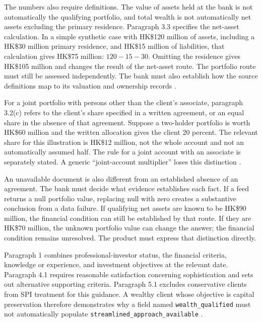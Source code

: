 The numbers also require definitions. The value of assets held at the bank is
not automatically the qualifying portfolio, and total wealth is not automatically
net assets excluding the primary residence. Paragraph 3.3 specifies the net-asset
calculation. In a simple synthetic case with HK\$120 million of assets, including
a HK\$30 million primary residence, and HK\$15 million of liabilities, that
calculation gives HK\$75 million: $120-15-30$. Omitting the residence gives
HK\$105 million and changes the result of the net-asset route. The portfolio
route must still be assessed independently. The bank must also establish how the
source definitions map to its valuation and ownership records
\citep[Annex 1, paras.~3.2--3.4]{sfcspiannex1}.

For a joint portfolio with persons other than the client's associate, paragraph
3.2(c) refers to the client's share specified in a written agreement, or an equal
share in the absence of that agreement. Suppose a two-holder portfolio is worth
HK\$60 million and the written allocation gives the client 20 percent. The
relevant share for this illustration is HK\$12 million, not the whole account
and not an automatically assumed half. The rule for a joint account with an
associate is separately stated. A generic ``joint-account multiplier'' loses
this distinction \citep[Annex 1, para.~3.2]{sfcspiannex1}.

An unavailable document is also different from an established absence of an
agreement. The bank must decide what evidence establishes each fact. If a feed
returns a null portfolio value, replacing null with zero creates a substantive
conclusion from a data failure. If qualifying net assets are known to be
HK\$90 million, the financial condition can still be established by that route.
If they are HK\$70 million, the unknown portfolio value can change the answer;
the financial condition remains unresolved. The product must express that
distinction directly.

Paragraph 1 combines professional-investor status, the financial criteria,
knowledge or experience, and investment objectives at the relevant date.
Paragraph 4.1 requires reasonable satisfaction concerning sophistication and
sets out alternative supporting criteria. Paragraph 5.1 excludes conservative
clients from SPI treatment for this guidance. A wealthy client whose objective
is capital preservation therefore demonstrates why a field named
\texttt{wealth\_qualified} must not automatically populate
\texttt{streamlined\_approach\_available}
\citep[Annex 1, paras.~1, 4--5]{sfcspiannex1}.

